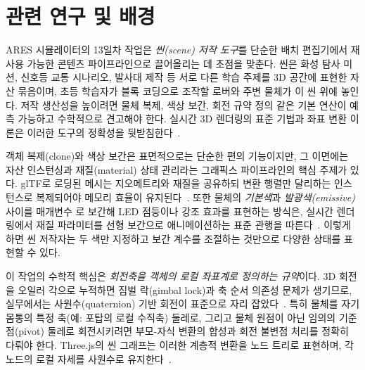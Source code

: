 \smallskip
{}



\section{관련 연구 및 배경}

ARES 시뮬레이터의 13일차 작업은 \emph{씬(scene) 저작 도구}를 단순한 배치 편집기에서 재사용 가능한 콘텐츠 파이프라인으로 끌어올리는 데 초점을 맞춘다. 씬은 화성 탐사 미션, 신호등 교통 시나리오, 발사대 제작 등 서로 다른 학습 주제를 3D 공간에 표현한 자산 묶음이며, 초등 학습자가 블록 코딩으로 조작할 로버와 주변 물체가 이 씬 위에 놓인다. 저작 생산성을 높이려면 물체 복제, 색상 보간, 회전 규약 정의 같은 기본 연산이 예측 가능하고 수학적으로 견고해야 한다. 실시간 3D 렌더링의 표준 기법과 좌표 변환 이론은 이러한 도구의 정확성을 뒷받침한다~\cite{akenine2018realtime,threejs}.

객체 복제(clone)와 색상 보간은 표면적으로는 단순한 편의 기능이지만, 그 이면에는 자산 인스턴싱과 재질(material) 상태 관리라는 그래픽스 파이프라인의 핵심 주제가 있다. glTF로 로딩된 메시는 지오메트리와 재질을 공유하되 변환 행렬만 달리하는 인스턴스로 복제되어야 메모리 효율이 유지된다~\cite{gltf,meshopt}. 또한 물체의 \emph{기본색}과 \emph{발광색(emissive)} 사이를 매개변수 로 보간해 LED 점등이나 강조 효과를 표현하는 방식은, 실시간 렌더링에서 재질 파라미터를 선형 보간으로 애니메이션하는 표준 관행을 따른다~\cite{webgl,akenine2018realtime}. 이렇게 하면 씬 저작자는 두 색만 지정하고 보간 계수를 조절하는 것만으로 다양한 상태를 표현할 수 있다.

이 작업의 수학적 핵심은 \emph{회전축을 객체의 로컬 좌표계로 정의하는 규약}이다. 3D 회전을 오일러 각으로 누적하면 짐벌 락(gimbal lock)과 축 순서 의존성 문제가 생기므로, 실무에서는 사원수(quaternion) 기반 회전이 표준으로 자리 잡았다~\cite{akenine2018realtime}. 특히 물체를 자기 몸통의 특정 축(예: 포탑의 로컬 수직축) 둘레로, 그리고 물체 원점이 아닌 임의의 기준점(pivot) 둘레로 회전시키려면 부모-자식 변환의 합성과 회전 불변점 처리를 정확히 다뤄야 한다. Three.js의 씬 그래프는 이러한 계층적 변환을 노드 트리로 표현하며, 각 노드의 로컬 자세를 사원수로 유지한다~\cite{threejs}.

